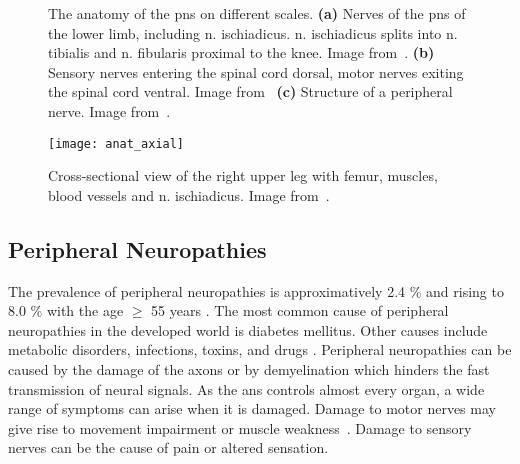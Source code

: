 \begin{figure}[htbp]
    \begin{minipage}[c][0.9\textheight][t]{.5\textwidth}
        \centering
        \vspace*{\fill}
    \end{minipage}
    \begin{minipage}[c][0.9\textheight][t]{.5\textwidth}
        \centering
        \vspace*{\fill}
        \vfill
    \end{minipage}
    \vspace*{-0.3cm}
    \caption[Anatomy of the Peripheral Nervous System]{The anatomy of the \gls{pns} on different scales. \textbf{(a)} Nerves of the \gls{pns} of the lower limb, including \gls{n.} ischiadicus. \gls{n.} ischiadicus splits into \gls{n.} tibialis and \gls{n.} fibularis proximal to the knee. Image from~\cite{Schunke2014PrometheusAnatomie}. \textbf{(b)} Sensory nerves entering the spinal cord dorsal, motor nerves exiting the spinal cord ventral. Image from~\cite{Schunke2015THIEMEAnatomy} \textbf{(c)} Structure of a peripheral nerve. Image from~\cite{Schunke2015THIEMEAnatomy}.}
    \label{fig:anat}
\end{figure}

\begin{figure}[htbp]
	\texttt{[image: anat\_axial]}
    \caption[Cross-section of the Right Upper Leg]{Cross-sectional view of the right upper leg with femur, muscles, blood vessels and \gls{n.} ischiadicus. Image from~\cite{Schunke2014PrometheusAnatomie}.}
    \label{fig:anat_axial}
\end{figure}

\subsection{Peripheral Neuropathies}
The prevalence of peripheral neuropathies is approximatively 2.4 \% and rising to 8.0 \% with the age $\geq$ 55 years \cite{Martyn1997EpidemiologyNeuropathy}. The most common cause of peripheral neuropathies in the developed world is diabetes mellitus. Other causes include metabolic disorders, infections, toxins, and drugs \cite{England2004PeripheralNeuropathy,Hughes466}.
Peripheral neuropathies can be caused by the damage of the axons or by demyelination which hinders the fast transmission of neural signals. 
As the \gls{ans} controls almost every organ, a wide range of symptoms can arise when it is damaged. Damage to motor nerves may give rise to movement impairment or muscle weakness~\cite{Mohassel2015}. Damage to sensory nerves can be the cause of pain or altered sensation.

